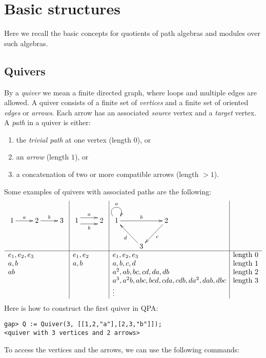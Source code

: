 \documentclass{amsart}
\theoremstyle{definition}
\theoremstyle{theoretic}
\begin{document}
\section{Basic structures}

Here we recall the basic concepts for quotients of path algebras and
modules over such algebras.

\subsection{Quivers}
By a \emph{quiver} we mean a finite directed graph, where loops and
multiple edges are allowed.  A quiver consists of a finite set of
\emph{vertices} and a finite set of oriented \emph{edges} or
\emph{arrows}.  Each arrow has an associated \emph{source} vertex and
a \emph{target} vertex.  A \emph{path} in a quiver is either:
\begin{enumerate}[\rm(i)]
\item the \emph{trivial path} at one vertex (length $0$), or
\item an \emph{arrow} (length $1$), or 
\item a concatenation of two or more compatible arrows (length $> 1$).
\end{enumerate}  
Some examples of quivers with associated paths are the following:
\[\begin{array}{l|l|l|l}
\xymatrix{1\ar[r]^a & 2\ar[r]^b & 3}  &
\xymatrix{1\ar@<1ex>[r]^a\ar@<-1ex>[r]_b & 2} & 
\xymatrix{1\ar@(ul,ur)^a\ar[rr]^b & & 2\ar[dl]^c \\ & 3\ar[ul]^d & } &
\\ \hline
e_1, e_2, e_3 & e_1, e_2 & e_1, e_2, e_3 & \textrm{length 0}\\
a, b & a, b & a, b, c, d & \textrm{length 1}\\
ab & & a^2, ab, bc, cd, da, db & \textrm{length 2}\\
& & a^3, a^2b, abc, bcd, cda, cdb, da^2, dab, dbc & \textrm{length 3}\\
& & \vdots & 
\end{array}\]
Here is how to construct the first quiver in QPA:
\begin{verbatim}
gap> Q := Quiver(3, [[1,2,"a"],[2,3,"b"]]); 
<quiver with 3 vertices and 2 arrows>
\end{verbatim} 
To access the vertices and the arrows, we can use the following commands:
\end{document}
